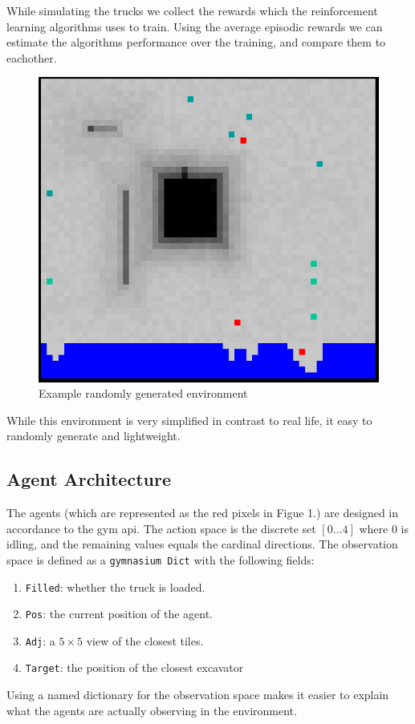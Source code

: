 \documentclass[conference]{IEEEtran}
\begin{document}
While simulating the trucks we collect the rewards which the reinforcement learning algorithms uses to train.
Using the average episodic rewards we can estimate the algorithms performance over the training, and compare them to eachother.
\begin{figure}[h!]
	\includegraphics[width=0.9\columnwidth]{graphs/example_env.png}
	\caption{Example randomly generated environment}
\end{figure}
While this environment is very simplified in contrast to real life, it easy to randomly generate and lightweight.

\subsection{Agent Architecture}
The agents (which are represented as the red pixels in Figue 1.) are designed in accordance to the gym api.
The action space is the discrete set $[0 \ldots 4]$ where $0$ is idling, and the remaining values equals the cardinal directions.
The observation space is defined as a \texttt{gymnasium Dict} with the following fields:
\begin{enumerate}
	\item \texttt{Filled}: whether the truck is loaded.
	\item \texttt{Pos}: the current position of the agent.
	\item \texttt{Adj}: a $5\times 5$ view of the closest tiles.
	\item \texttt{Target}: the position of the closest excavator
\end{enumerate}
Using a named dictionary for the observation space makes it easier to explain what the agents are actually observing in the environment.
\end{document}
